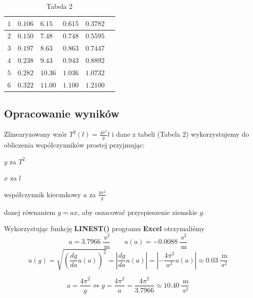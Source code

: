 \documentclass{fizykalab}
\begin{document}
{\begin{table}[!ht]
\begin{tabular}{|l|l|l|l|l|l|}
		  $1$                & $0.106$              & $6.15$                  & $0.615$               & $0.3782$                  \\ \hline
		  $2$                & $0.150$              & $7.48$                  & $0.748$               & $0.5595$                  \\ \hline
		  $3$                & $0.197$              & $8.63$                  & $0.863$               & $0.7447$                  \\ \hline
		  $4$                & $0.238$              & $9.43$                  & $0.943$               & $0.8892$                  \\ \hline
		  $5$                & $0.282$              & $10.36$                 & $1.036$               & $1.0732$                  \\ \hline
		  $6$                & $0.322$              & $11.00$                 & $1.100$               & $1.2100$                  \\ \hline
	  \end{tabular}
	  \caption*{Tabela 2}
  \end{table}

  \subsection*{Opracowanie wyników}
  \par
  Zlinearyzowany wzór $T^2(l) = \frac{4\pi^2}{g}l$ i dane z tabeli (Tabela 2) wykorzystujemy do obliczenia współczynników prostej przyjmując:

  \quad $y$ za $T^2$

  \quad $x$ za $l$

  \quad współczynnik kierunkowy $a$ za $\frac{4\pi^2}{g}$

  danej równaniem $y = ax$, aby oszacować przyspieszenie ziemskie $g$.

  \par
  Wykorzystując funkcję \textbf{LINEST()} programu \textbf{Excel} otrzymaliśmy
  \[ a = 3.7966 \ \frac{\SI{}{\second}^2}{\SI{}{\meter}} \quad\quad u(a) = -0.0088 \ \frac{\SI{}{\second}^2}{\SI{}{\meter}}\]
  \[ u(g) = \sqrt{\left( \frac{dg}{da}u(a) \right)^2} = \left| \frac{dg}{da}u(a) \right| = \left| -\frac{4\pi^2}{a^2}u(a) \right| \approx 0.03 \ \frac{\SI{}{\meter}}{\SI{}{\second}^2}\]

  \begin{equation*}
	  \boxed{
		  a = \frac{4\pi^2}{g} \Leftrightarrow g = \frac{4\pi^2}{a} = \frac{4\pi^2}{3.7966} \approx 10.40 \ \frac{\SI{}{\meter}}{\SI{}{\second}^2}
	  }
  \end{equation*}


}
\end{document}
